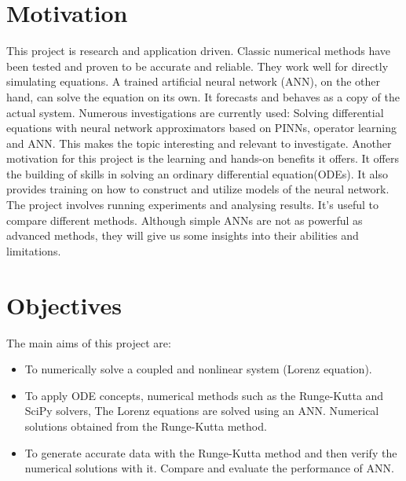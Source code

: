 \section{Motivation}
This project is research and application driven. Classic numerical methods have been tested and proven to be accurate and reliable. They work well for directly simulating equations. A trained artificial neural network (ANN), on the other hand, can solve the equation on its own. It forecasts and behaves as a copy of the actual system. Numerous investigations are currently used: Solving differential equations with neural network approximators based on PINNs, operator learning and ANN. This makes the topic interesting and relevant to investigate. Another motivation for this project is the learning and hands-on benefits it offers. It offers the building of skills in solving an ordinary differential equation(ODEs). It also provides training on how to construct and utilize models of the neural network. The project involves running experiments and analysing results. It's useful to compare different methods. Although simple ANNs are not as powerful as advanced methods, they will give us some insights into their abilities and limitations.



\section{Objectives}
The main aims of this project are:


\begin{itemize}
    \item  To numerically solve a coupled and nonlinear system (Lorenz equation).

\end{itemize}

\begin{itemize}
    \item To apply ODE concepts, numerical methods such as the Runge-Kutta and SciPy solvers, The Lorenz equations are solved using an ANN. Numerical solutions obtained from the Runge-Kutta method.


\end{itemize}

\begin{itemize}
    \item To generate accurate data with the Runge-Kutta method and then verify the numerical solutions with it. Compare and evaluate the performance of ANN.
    
\end{itemize}


